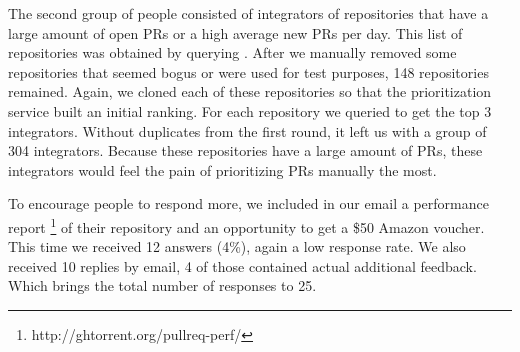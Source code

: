 The second group of people consisted of integrators of repositories that have a large amount of open PRs or a high average new PRs per day.
This list of repositories was obtained by querying \ghtorrent.
After we manually removed some repositories that seemed bogus or were used for test purposes, 148 repositories remained.
Again, we cloned each of these repositories so that the prioritization service built an initial ranking.
For each repository we queried \ghtorrent to get the top 3 integrators.
Without duplicates from the first round, it left us with a group of 304 integrators.
Because these repositories have a large amount of PRs, these integrators would feel the pain of prioritizing PRs manually the most.

To encourage people to respond more, we included in our email a performance report \footnote{http://ghtorrent.org/pullreq-perf/} of their repository and an opportunity to get a \$50 Amazon voucher.
This time we received 12 answers (4\%), again a low response rate.
We also received 10 replies by email, 4 of those contained actual additional feedback.
Which brings the total number of responses to 25.
